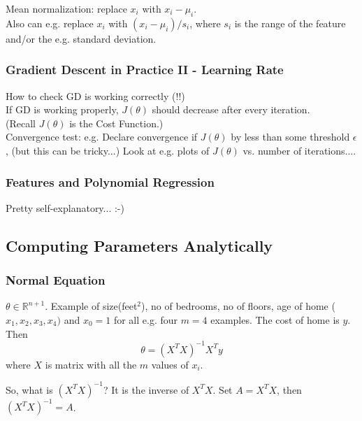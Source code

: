 \documentclass[11pt,a4paper]{article}
\begin{document}
    Mean normalization: replace $x_{i}$ with $x_{i} - \mu_{i}$. \\
    Also can e.g. replace $x_{i}$ with $(x_{i} - \mu_{i})/s_{i}$, where 
    $s_{i}$ is the range of the feature and/or the e.g. standard deviation.     
    
    \subsubsection{Gradient Descent in Practice II - Learning Rate}
    How to check GD is working correctly (!!) \\
    If GD is working properly, $J(\theta)$ should decrease after every iteration. \\
    (Recall $J(\theta)$ is the Cost Function.)\\
    Convergence test: e.g. Declare convergence if $J(\theta)$ by less than some 
    threshold $\epsilon$, (but this can be tricky...) Look at e.g. plots of $J(\theta)$ 
    vs. number of iterations....\\
    
    \subsubsection{Features and Polynomial Regression}
    Pretty self-explanatory... :-) \\


    \subsection{Computing Parameters Analytically}
    \subsubsection{Normal Equation}
    $\theta \in \mathbb{R}^{n+1}$. 
    Example of size(feet$^{2}$), no of bedrooms, no of floors, age of home ($x_{1}, x_{2}, x_{3}, x_{4})$
    and $x_{0}=1$ for all e.g. four $m=4$ examples. 
    The cost of home is $y$. \\
    Then 
    \begin{equation}
      \theta = (X^{T} X)^{-1} X^{T} y
    \end{equation}
    where $X$ is matrix with all the $m$ values of  $x_{i}$. 
    
    So, what is $(X^{T} X)^{-1}$? It is the inverse of $X^{T} X$. 
    Set $A = X^{T} X$, then $(X^{T} X)^{-1} =A$. \\
\end{document}
